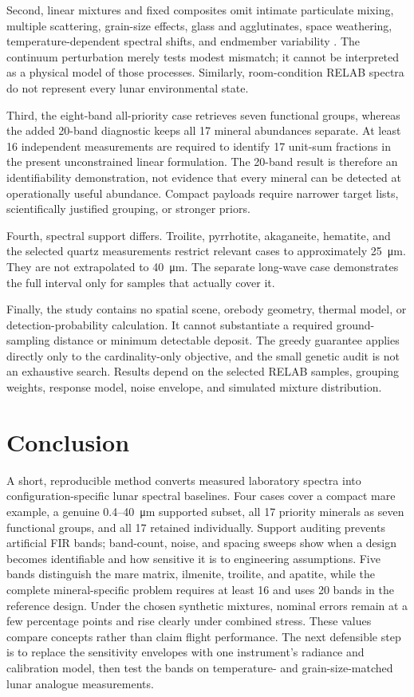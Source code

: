 \documentclass[a4paper,10pt,twocolumn]{article}
\begin{document}
Second, linear mixtures and fixed composites omit intimate particulate mixing, multiple scattering, grain-size effects, glass and agglutinates, space weathering, temperature-dependent spectral shifts, and endmember variability \cite{hapke2012theory}. The continuum perturbation merely tests modest mismatch; it cannot be interpreted as a physical model of those processes. Similarly, room-condition RELAB spectra do not represent every lunar environmental state.

Third, the eight-band all-priority case retrieves seven functional groups, whereas the added 20-band diagnostic keeps all 17 mineral abundances separate. At least 16 independent measurements are required to identify 17 unit-sum fractions in the present unconstrained linear formulation. The 20-band result is therefore an identifiability demonstration, not evidence that every mineral can be detected at operationally useful abundance. Compact payloads require narrower target lists, scientifically justified grouping, or stronger priors.

Fourth, spectral support differs. Troilite, pyrrhotite, akaganeite, hematite, and the selected quartz measurements restrict relevant cases to approximately \SI{25}{\micro\metre}. They are not extrapolated to \SI{40}{\micro\metre}. The separate long-wave case demonstrates the full interval only for samples that actually cover it.

Finally, the study contains no spatial scene, orebody geometry, thermal model, or detection-probability calculation. It cannot substantiate a required ground-sampling distance or minimum detectable deposit. The greedy guarantee applies directly only to the cardinality-only objective, and the small genetic audit is not an exhaustive search. Results depend on the selected RELAB samples, grouping weights, response model, noise envelope, and simulated mixture distribution.

\section{Conclusion}

A short, reproducible method converts measured laboratory spectra into configuration-specific lunar spectral baselines. Four cases cover a compact mare example, a genuine 0.4--\SI{40}{\micro\metre} supported subset, all 17 priority minerals as seven functional groups, and all 17 retained individually. Support auditing prevents artificial FIR bands; band-count, noise, and spacing sweeps show when a design becomes identifiable and how sensitive it is to engineering assumptions. Five bands distinguish the mare matrix, ilmenite, troilite, and apatite, while the complete mineral-specific problem requires at least 16 and uses 20 bands in the reference design. Under the chosen synthetic mixtures, nominal errors remain at a few percentage points and rise clearly under combined stress. These values compare concepts rather than claim flight performance. The next defensible step is to replace the sensitivity envelopes with one instrument's radiance and calibration model, then test the bands on temperature- and grain-size-matched lunar analogue measurements.
\end{document}
